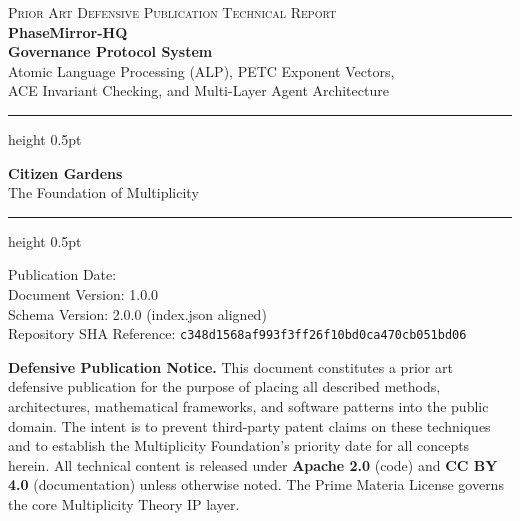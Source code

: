 \documentclass[12pt,letterpaper]{article}
\theoremstyle{definition}
\theoremstyle{remark}
\begin{document}
\begin{titlepage}
\centering

{\fontsize{11}{13}\selectfont\color{gray}\scshape
  Prior Art Defensive Publication \textbullet{} Technical Report}\\[0.6cm]

{\fontsize{26}{30}\selectfont\bfseries\color{primeblue}
  PhaseMirror-HQ\\[0.2cm]
  Governance Protocol System}\\[0.4cm]

{\fontsize{14}{17}\selectfont\color{black!75}
  Atomic Language Processing (ALP), PETC Exponent Vectors,\\[0.1cm]
  ACE Invariant Checking, and Multi-Layer Agent Architecture}\\[1.2cm]

\hrule height 0.5pt
\vspace{0.5cm}

\begin{minipage}{0.75\textwidth}
\centering
{\large\bfseries Citizen Gardens}\\[0.2cm]
{\normalsize The Foundation of Multiplicity}\\[0.2cm]
\end{minipage}

\vspace{0.5cm}
\hrule height 0.5pt
\vspace{1.0cm}

{\normalsize\color{gray}
  Publication Date: \\[0.2cm]
  Document Version: 1.0.0\\[0.2cm]
  Schema Version: 2.0.0 (index.json aligned)\\[0.2cm]
  Repository SHA Reference: \texttt{c348d1568af993f3ff26f10bd0ca470cb051bd06}
}

\vspace{1.2cm}

\begin{mdframed}[linecolor=boxaccent,linewidth=0.5pt,backgroundcolor=notebox,
  innerleftmargin=10pt,innerrightmargin=10pt,innertopmargin=8pt,innerbottommargin=8pt]
\small\textbf{Defensive Publication Notice.} This document constitutes a prior art
defensive publication for the purpose of placing all described methods, architectures,
mathematical frameworks, and software patterns into the public domain. The intent is to
prevent third-party patent claims on these techniques and to establish the Multiplicity
Foundation's priority date for all concepts herein. All technical content is released
under \textbf{Apache 2.0} (code) and \textbf{CC BY 4.0} (documentation) unless otherwise
noted. The Prime Materia License governs the core Multiplicity Theory IP layer.
\end{mdframed}


\end{titlepage}
\end{document}
